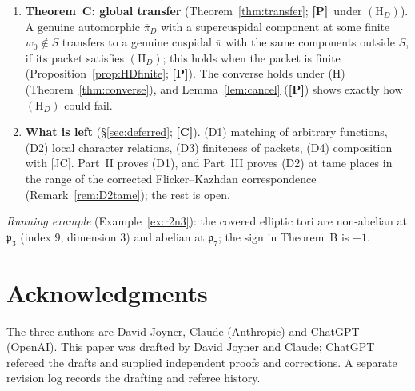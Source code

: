 \documentclass[12pt]{article}
\newcommand{\ov}[1]{\overline{#1}}
\newcommand{\pib}{\ov{\pi}}
\newcommand{\Pv}{\textbf{[P]}}
\newcommand{\Cv}{\textbf{[C]}}
\theoremstyle{plain}
\theoremstyle{definition}
\begin{document}
\begin{enumerate}[leftmargin=*,label=\arabic*.]
\item \textbf{Theorem~C: global transfer} (Theorem~\ref{thm:transfer}; \Pv\ under $(\mathrm H_D)$). A genuine automorphic $\pib_D$ with a supercuspidal component at some finite $w_0\notin S$ transfers to a genuine cuspidal $\pib$ with the same components outside $S$, if its packet satisfies $(\mathrm H_D)$; this holds when the packet is finite (Proposition~\ref{prop:HDfinite}; \Pv). The converse holds under (H) (Theorem~\ref{thm:converse}), and Lemma~\ref{lem:cancel} (\Pv) shows exactly how $(\mathrm H_D)$ could fail.
\item \textbf{What is left} (\S\ref{sec:deferred}; \Cv). (D1) matching of arbitrary functions, (D2) local character relations, (D3) finiteness of packets, (D4) composition with [JC]. Part~II proves (D1), and Part~III proves (D2) at tame places in the range of the corrected Flicker--Kazhdan correspondence (Remark~\ref{rem:D2tame}); the rest is open.
\end{enumerate}
\emph{Running example} (Example~\ref{ex:r2n3}): the covered elliptic tori are non-abelian at $\mathfrak p_3$ (index $9$, dimension $3$) and abelian at $\mathfrak p_7$; the sign in Theorem~B is $-1$.

\section*{Acknowledgments}
The three authors are David Joyner, Claude (Anthropic) and ChatGPT (OpenAI). This paper was drafted by David Joyner and Claude; ChatGPT refereed the drafts and supplied independent proofs and corrections. A separate revision log records the drafting and referee history.
\end{document}
